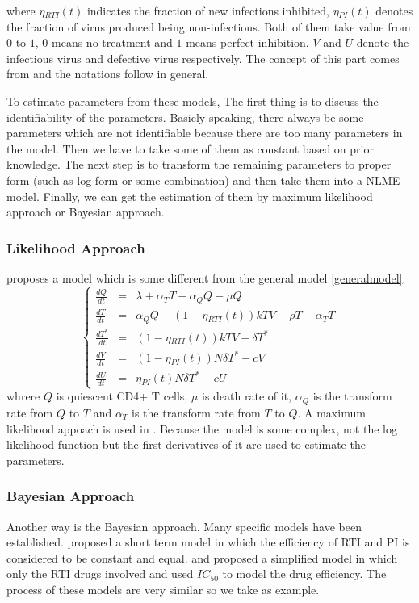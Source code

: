 \documentclass[12pt]{extarticle}
\begin{document}
where $\eta{}_{RTI}(t)$ indicates the fraction of new infections inhibited, $\eta{}_{PI}(t)$ denotes the fraction of virus produced being non-infectious. Both of them take value from $0$ to $1$, $0$ means no treatment and $1$ means perfect inhibition. $V$ and $U$ denote the infectious virus and defective virus respectively. The concept of this part comes from \cite{Putter02} and the notations follow \cite{Huang0601} in general.

To estimate parameters from these models, The first thing is to discuss the identifiability of the parameters. Basicly speaking, there always be some parameters which are not identifiable because there are too many parameters in the model. Then we have to take some of them as constant based on prior knowledge. The next step is to transform the remaining parameters to proper form (such as log form or some combination) and then take them into a NLME model. Finally, we can get the estimation of them by maximum likelihood approach or Bayesian approach.
\subsubsection{Likelihood Approach}
\label{sect:likelihoodapproach}
\cite{Guedj07} proposes a model which is some different from the general model \eqref{generalmodel}.
\begin{equation}
\left\{
\begin{array}{rcl}
\frac{dQ}{dt} & = & \lambda{}+\alpha{}_{T}T-\alpha{}_{Q}Q-\mu{}Q \\
\frac{dT}{dt} & = & \alpha{}_{Q}Q-(1-\eta{}_{RTI}(t))kTV-\rho{}T-\alpha{}_{T}T \\
\frac{dT^{*}}{dt} & = & (1-\eta{}_{RTI}(t))kTV-\delta{}T^{*} \\
\frac{dV}{dt} & = & (1-\eta{}_{PI}(t))N\delta{}T^{*}-cV \\
\frac{dU}{dt} & = & \eta{}_{PI}(t)N\delta{}T^{*}-cU
\end{array}
\right.
\end{equation}
whrere $Q$ is quiescent CD4+ T cells, $\mu{}$ is death rate of it, $\alpha{}_Q$ is the transform rate from $Q$ to $T$ and $\alpha{}_T$ is the transform rate from $T$ to $Q$.
A maximum likelihood appoach is used in \cite{Guedj07}. Because the model is some complex, not the log likelihood function but the first derivatives of it are used to estimate the parameters. 
\subsubsection{Bayesian Approach}
\label{sect:bayesianapproach}
Another way is the Bayesian approach. Many specific models have been established. \cite{Putter02} proposed a short term model in which the efficiency of RTI and PI is considered to be constant and equal. \cite{Huang0601} and \cite{Huang0602} proposed a simplified model in which only the RTI drugs involved and used $IC_{50}$ to model the drug efficiency. The process of these models are very similar so we take \cite{Huang0601} as example.
\end{document}
